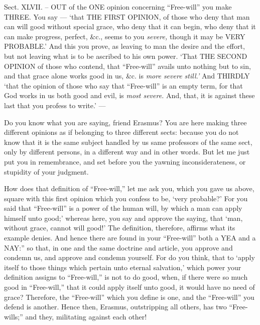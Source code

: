 Sect. XLVII. – \textsc{OUT }of the \textsc{ONE }opinion concerning “Free-will” you make \textsc{THREE}. You say — ‘that \textsc{THE FIRST OPINION}, of those who deny that man can will good without special grace, who deny that it can begin, who deny that it can make progress, perfect, \&c., seems to you \emph{severe, }though it may be \textsc{VERY PROBABLE}.’ And this you prove, as leaving to man the desire and the effort, but not leaving what is to be ascribed to his own power. ‘That \textsc{THE SECOND OPINION} of those who contend, that “Free-will” avails unto nothing but to sin, and that grace alone works good in us, \&c. is \emph{more severe still.’ }And \textsc{THIRDLY} ‘that the opinion of those who say that “Free-will” is an empty term, for that God works in us both good and evil, is \emph{most severe. }And, that, it is against these last that you profess to write.’ —

Do you know what you are saying, friend Erasmus? You are here making three different opinions as if belonging to three different sects: because you do not know that it is the same subject handled by us same professors of the same sect, only by different persons, in a different way and in other words. But let me just put you in remembrance, and set before you the yawning inconsiderateness, or stupidity of your judgment.

How does that definition of “Free-will,” let me ask you, which you gave us above, square with this first opinion which you confess to be, ‘very probable?’ For you said that “Free-will” is a power of the human will, by which a man can apply himself unto good;’ whereas here, you say and approve the saying, that ‘man, without grace, cannot will good!’ The definition, therefore, affirms what its example denies. And hence there are found in your “Free-will” both a \textsc{YEA }and a \textsc{NAY}:” so that, in one and the same doctrine and article, you approve and condemn us, and approve and condemn yourself. For do you think, that to ‘apply itself to those things which pertain unto eternal salvation,’ which power your definition assigns to “Free-will,” is not to do good, when, if there were so much good in “Free-will,” that it could apply itself unto good, it would have no need of grace? Therefore, the “Free-will” which you define is one, and the “Free-will” you defend is another. Hence then, Erasmus, outstripping all others, has two “Free-wills;” and they, militating against each other!


